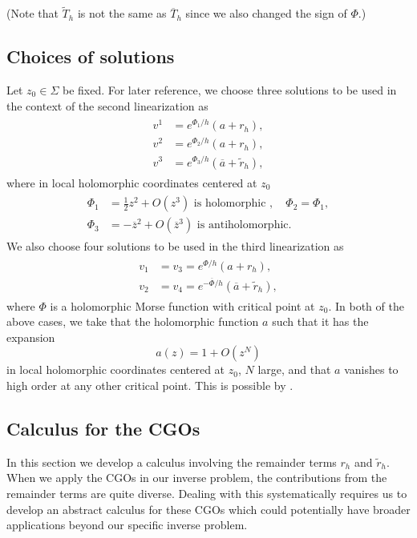 \documentclass[12pt]{amsart}
\def\R{\mathbb R}
\theoremstyle{definition}
\theoremstyle{remark}
\newcommand{\z}{\overline{z}}
\begin{document}
(Note that $\tilde T_h$ is not the same as $\overline T_h$ since we also changed the sign of $\Phi$.)

\subsection{Choices of solutions}\label{subsection:choices_of_solutions}
Let $z_0\in \Sigma$ be fixed. For later reference, we choose three solutions to be used in the context of the second linearization as
{\color{black}\begin{align}\label{eq:sols_for_second}
 \begin{split}
 v^1&=e^{\Phi_1/h}(a+r_h), \\
 v^2&=e^{\Phi_2/h}(a+r_h), \\
 v^3&=e^{\Phi_3/h}(\overline a+\tilde r_h),
 \end{split}
\end{align}}
where in local holomorphic coordinates centered at $z_0$ 
{\color{black}\begin{align*}
\begin{split}
\Phi_1&=\frac{1}{2}z^2+O(z^3) \text{ is holomorphic }, \quad \Phi_2=\Phi_1, \\
\Phi_3&=-\z^2+O(\z^3) \text{ is antiholomorphic}.
\end{split}
\end{align*}}
We also choose four solutions to be used in the third linearization as
    \begin{align}\label{eq:sols_for_4th}
    \begin{split}
    v_1&=v_3=e^{\Phi/h}(a+r_h), \\
    v_2&=v_4=e^{-\overline \Phi/h}(\overline a+\tilde r_h), 
    \end{split}
    \end{align}
where $\Phi$ is a holomorphic Morse function with critical point at $z_0$.  In both of the above cases, we take that the holomorphic function $a$ such that it has the expansion 
    \[
    a(z)=1+O(z^N)
    \]
    in local holomorphic coordinates centered at $z_0$, $N$ large, and that $a$ vanishes to high order at any other critical point.
This is possible by \cite[Lemma 2.2.4]{guillarmou2011calderon}.

\subsection{Calculus for the CGOs}
In this section we develop a calculus involving the remainder terms $r_h$ and $\tilde r_h$. When we apply the CGOs in our inverse problem, the contributions from the remainder terms are quite diverse. Dealing with this systematically requires us to develop an abstract calculus for these CGOs which could potentially have broader applications beyond our specific inverse problem.
\end{document}

